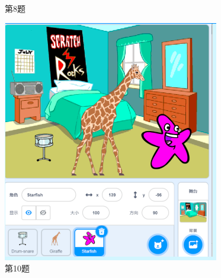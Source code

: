 \documentclass[10pt, a4paper]{article}
\begin{document}
\begin{enumerate}
\begin{figure}[htbp]
\begin{minipage}[t]{.23\textwidth}
\begin{minipage}[t]{.3\textwidth}
                \end{minipage}
                \caption*{第8题}
            \end{minipage}
            \begin{minipage}[t]{.2\textwidth}
                \centering
                \includegraphics[width=\textwidth]{10.png}
                \caption*{第10题}
            \end{minipage}
            \begin{minipage}[t]{.13\textwidth}
                \centering

\end{minipage}
\end{figure}
\end{enumerate}
\end{document}

